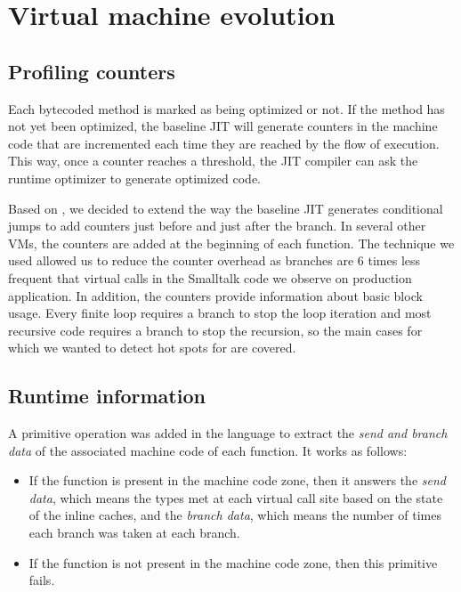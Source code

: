 \documentclass[a4paper,12pt,twoside]{../includes/ThesisStyle}
\begin{document}
\section{Virtual machine evolution}

\subsection{Profiling counters}

Each bytecoded method is marked as being optimized or not. If the method has not yet been optimized, the baseline JIT will generate counters in the machine code that are incremented each time they are reached by the flow of execution. This way, once a counter reaches a threshold, the JIT compiler can ask the runtime optimizer to generate optimized code.

Based on \cite{Arn02}, we decided to extend the way the baseline JIT generates conditional jumps to add counters just before and just after the branch. In several other VMs, the counters are added at the beginning of each function. The technique we used allowed us to reduce the counter overhead as branches are 6 times less frequent that virtual calls in the Smalltalk code we observe on production application. In addition, the counters provide information about basic block usage. Every finite loop requires a branch to stop the loop iteration and most recursive code requires a branch to stop the recursion, so the main cases for which we wanted to detect hot spots for are covered.

\subsection{Runtime information}


A primitive operation was added in the language to extract the \emph{send and branch data} of the associated machine code of each function. It works as follows:
\begin{itemize}
\item If the function is present in the machine code zone, then it answers the \emph{send data}, which means the types met at each virtual call site based on the state of the inline caches, and the \emph{branch data}, which means the number of times each branch was taken at each branch.
\item If the function is not present in the machine code zone, then this primitive fails.
\end{itemize}
\end{document}
